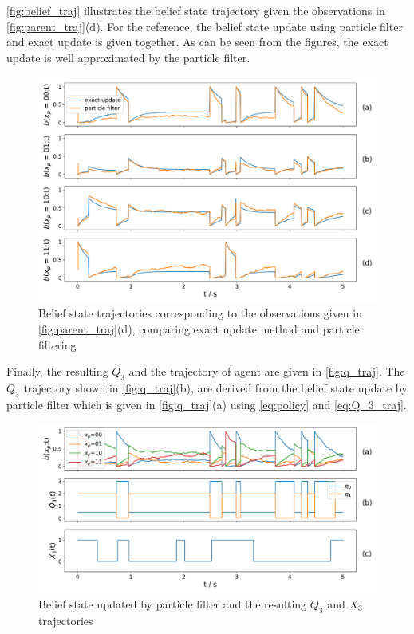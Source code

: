 \autoref{fig:belief_traj} illustrates the belief state trajectory given the observations in \autoref{fig:parent_traj}(d). For the reference, the belief state update using particle filter and exact update is given together. As can be seen from the figures, the exact update is well approximated by the particle filter.
\begin{figure}[H]
	\begin{center}
		\includegraphics[width=.90\textwidth]{figures/sim_example/belief_traj}
		\caption{Belief state trajectories corresponding to the observations given in \autoref{fig:parent_traj}(d), comparing exact update method and particle filtering}
		\label{fig:belief_traj}
	\end{center}
\end{figure}
Finally, the resulting $ Q_3 $ and the trajectory of agent are given in \autoref{fig:q_traj}. The $ Q_3 $ trajectory shown in \autoref{fig:q_traj}(b), are derived from the belief state update by particle filter which is given in \autoref{fig:q_traj}(a) using \autoref{eq:policy} and \autoref{eq:Q_3_traj}.
\begin{figure}[H]
	\begin{center}
		\includegraphics[width=.90\textwidth]{figures/sim_example/q_traj}
		\caption{Belief state updated by particle filter and the resulting $ Q_3 $ and $ X_3 $ trajectories}
		\label{fig:q_traj}
	\end{center}
\end{figure}
